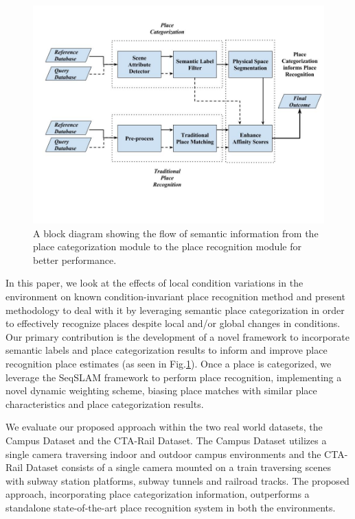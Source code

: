 \documentclass[letterpaper, 10 pt, conference]{ieeeconf}  %
\begin{document}
\begin{figure}
	\includegraphics[clip, trim=1cm 4cm 0cm 2cm,scale=0.26]{flowchart}
	\caption{A block diagram showing the flow of semantic information from the place categorization module to the place recognition module for better performance.}
	\label{fig:flowchart}
\end{figure}


In this paper, we look at the effects of local condition variations in the environment on known condition-invariant place recognition method and present methodology to deal with it by leveraging semantic place categorization in order to effectively recognize places despite local and/or global changes in conditions. Our primary contribution is the development of a novel framework to incorporate semantic labels and place categorization results to inform and improve place recognition place estimates (as seen in Fig.\ref{fig:flowchart}).  
Once a place is categorized, we leverage the SeqSLAM \cite{Milford2012} framework to perform place recognition, implementing a novel dynamic weighting scheme, biasing place matches with similar place characteristics and place categorization results. 

We evaluate our proposed approach within the two real world datasets, the Campus Dataset and the CTA-Rail Dataset. The Campus Dataset utilizes a single camera traversing indoor and outdoor campus environments and the CTA-Rail Dataset consists of a single camera mounted on a train traversing scenes with subway station platforms, subway tunnels and railroad tracks. The proposed approach, incorporating place categorization information,  outperforms a standalone state-of-the-art place recognition system in both the environments.  
\end{document}
